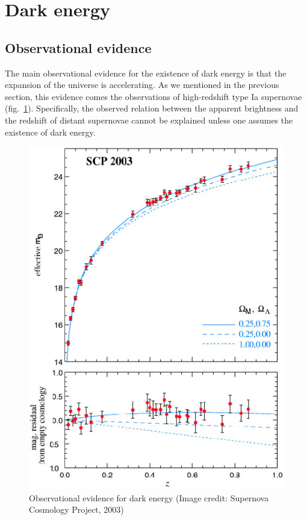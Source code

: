 \documentclass[11pt, a4paper,oneside,openright]{book}
\numberwithin{equation}{section}
\begin{document}
\section{Dark energy}

\subsection{Observational evidence}

The main observational evidence for the existence of dark energy is that the expansion of the universe is accelerating. As we mentioned in the previous section, this evidence comes the observations of high-redshift type Ia supernovae (fig.\ \ref{fig:lec10_7}). Specifically, the observed relation between the apparent brightness and the redshift of distant supernovae cannot be explained unless one assumes the existence of dark energy.
\begin{figure}[ht]
\begin{center}
\includegraphics[scale=0.5]{Draw/lec10_7.png}
\end{center}
\caption{Observational evidence for dark energy (Image credit: Supernova Cosmology Project, 2003)}
\label{fig:lec10_7}
\end{figure}
\end{document}
